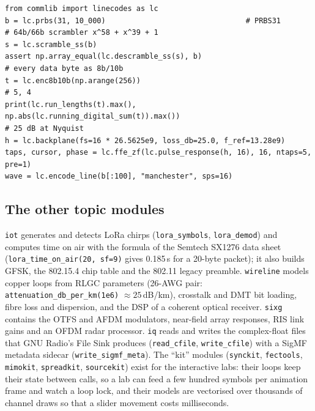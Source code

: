 \begin{lstlisting}
from commlib import linecodes as lc
b = lc.prbs(31, 10_000)                                # PRBS31
# 64b/66b scrambler x^58 + x^39 + 1
s = lc.scramble_ss(b)
assert np.array_equal(lc.descramble_ss(s), b)
# every data byte as 8b/10b
t = lc.enc8b10b(np.arange(256))
# 5, 4
print(lc.run_lengths(t).max(), np.abs(lc.running_digital_sum(t)).max())
# 25 dB at Nyquist
h = lc.backplane(fs=16 * 26.5625e9, loss_db=25.0, f_ref=13.28e9)
taps, cursor, phase = lc.ffe_zf(lc.pulse_response(h, 16), 16, ntaps=5, pre=1)
wave = lc.encode_line(b[:100], "manchester", sps=16)
\end{lstlisting}


\subsection{The other topic modules}

\texttt{iot} generates and detects LoRa chirps (\texttt{lora\_symbols}, \texttt{lora\_demod}) and
computes time on air with the formula of the Semtech SX1276 data sheet (\texttt{lora\_time\_on\_air(20,
sf=9)} gives 0.185\,s for a 20-byte packet); it also builds GFSK, the 802.15.4 chip table and the
802.11 legacy preamble. \texttt{wireline} models copper loops from RLGC parameters (26-AWG pair:
\texttt{attenuation\_db\_per\_km(1e6)} $\approx25$\,dB/km), crosstalk and DMT bit loading, fibre
loss and dispersion, and the DSP of a coherent optical receiver. \texttt{sixg} contains the OTFS and
AFDM modulators, near-field array responses, RIS link gains and an OFDM radar processor. \texttt{iq}
reads and writes the complex-float files that GNU Radio's File Sink produces
(\texttt{read\_cfile}, \texttt{write\_cfile}) with a SigMF metadata sidecar
(\texttt{write\_sigmf\_meta}). The ``kit'' modules (\texttt{synckit}, \texttt{fectools},
\texttt{mimokit}, \texttt{spreadkit}, \texttt{sourcekit}) exist for the interactive labs: their loops
keep their state between calls, so a lab can feed a few hundred symbols per animation frame and
watch a loop lock, and their models are vectorised over thousands of channel draws so that a
slider movement costs milliseconds.

